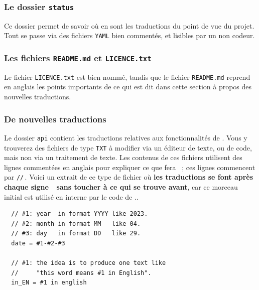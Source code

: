 \documentclass{../main/main}
\begin{document}
\subsubsection{Le dossier \texttt{status}}

Ce dossier permet de savoir où en sont les traductions du point de vue du projet. Tout se passe via des fichiers \verb#YAML# bien commentés, et lisibles par un non codeur.



\subsubsection{Les fichiers \texttt{README.md} et \texttt{LICENCE.txt}}

Le fichier \texttt{LICENCE.txt} est bien nommé, tandis que le fichier \texttt{README.md} reprend en anglais les points importants de ce qui est dit dans cette section à propos des nouvelles traductions.



\subsubsection{De nouvelles traductions}
\label{tutodoc-contrib-translate}

\begin{tdocimp}
    Le dossier \verb#api# contient les traductions relatives aux fonctionnalités de \thisproj.
    Vous y trouverez des fichiers de type \verb#TXT# à modifier via un éditeur de texte, ou de code, mais non via un traitement de texte.
    Les contenus de ces fichiers utilisent des lignes commentées en anglais pour expliquer ce que fera \thisproj\ ; ces lignes commencent par \verb#//#\,. Voici un extrait de ce type de fichier où \textbf{les traductions se font après chaque signe \,\fbox{$=$\vphantom{pM}}\ sans toucher à ce qui se trouve avant}, car ce morceau initial est utilisé en interne par le code de \thisproj..

    \tdocsep
    \vspace{-10pt}
    \begin{verbatim}
  // #1: year  in format YYYY like 2023.
  // #2: month in format MM   like 04.
  // #3: day   in format DD   like 29.
  date = #1-#2-#3

  // #1: the idea is to produce one text like
  //     "this word means #1 in English".
  in_EN = #1 in english\end{verbatim}
\end{tdocimp}
\end{document}
